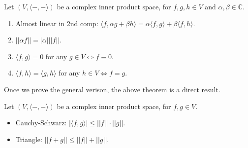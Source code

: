 \documentclass[12pt]{article}
\begin{document}
\begin{theorem}
    Let $(V,\langle-,-\rangle)$ be a complex inner product space, for $f,g,h\in V$ and $\alpha,\beta\in\mathbb{C}$.
    \begin{enumerate}
        \item Almost linear in 2nd comp: $\langle f,\alpha g+\beta h\rangle=\overline{\alpha}\langle f,g\rangle+\overline{\beta}\langle f,h\rangle$.
        \item $||\alpha f||=|\alpha|||f||$.
        \item $\langle f,g\rangle=0$ for any $g\in V \Leftrightarrow f\equiv0$.
        \item $\langle f,h\rangle=\langle g,h\rangle$ for any $h\in V \Leftrightarrow f=g$.
    \end{enumerate}
\end{theorem}

\begin{pfbox}
    Once we prove the general verison, the above theorem is a direct result.
\end{pfbox}

\begin{theorem}
    Let $(V,\langle-,-\rangle)$ be a complex inner product space, for $f,g\in V$.
    \begin{itemize}
        \item Cauchy-Schwarz: $|\langle f,g\rangle| \le ||f||\cdot||g||$.
        \item Triangle: $||f+g||\le||f||+||g||$.
    \end{itemize}
\end{theorem}
\end{document}
